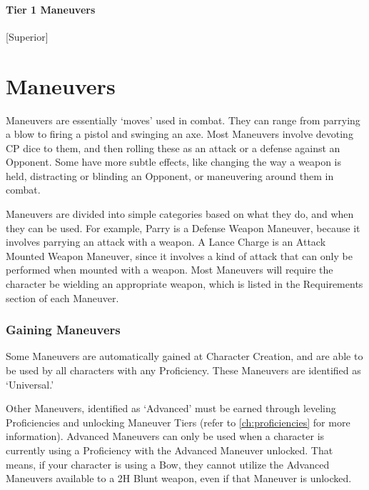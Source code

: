 \documentclass[oneside,11pt,english]{book}
\begin{document}
\subsubsection{Tier 1 Maneuvers}
 [Superior]

\chapter{Maneuvers}\label{ch:Maneuvers} %
\startcontents[chapters]
\clearpage
Maneuvers are essentially ‘moves’ used in combat. They can range from parrying a blow to firing a pistol and swinging an axe. Most Maneuvers involve devoting CP dice to them, and then rolling these as an attack or a defense against an Opponent. Some have more subtle effects, like changing the way a weapon is held, distracting or blinding an Opponent, or maneuvering around them in combat.

Maneuvers are divided into simple categories based on what they do, and when they can be used. For example, Parry is a Defense Weapon Maneuver, because it involves parrying an attack with a weapon. A Lance Charge is an Attack Mounted Weapon Maneuver, since it involves a kind of attack that can only be performed when mounted with a weapon. Most Maneuvers will require the character be wielding an appropriate weapon, which is listed in the Requirements section of each Maneuver.


\subsection{Gaining Maneuvers}
Some Maneuvers are automatically gained at Character Creation, and are able to be used by all characters with any Proficiency. These Maneuvers are identified as ‘Universal.’

Other Maneuvers, identified as ‘Advanced’ must be earned through leveling Proficiencies and unlocking Maneuver Tiers (refer to \autoref{ch:proficiencies} for more information). Advanced Maneuvers can only be used when a character is currently using a Proficiency with the Advanced Maneuver unlocked. That means, if your character is using a Bow, they cannot utilize the Advanced Maneuvers available to a 2H Blunt weapon, even if that Maneuver is unlocked.
\end{document}
